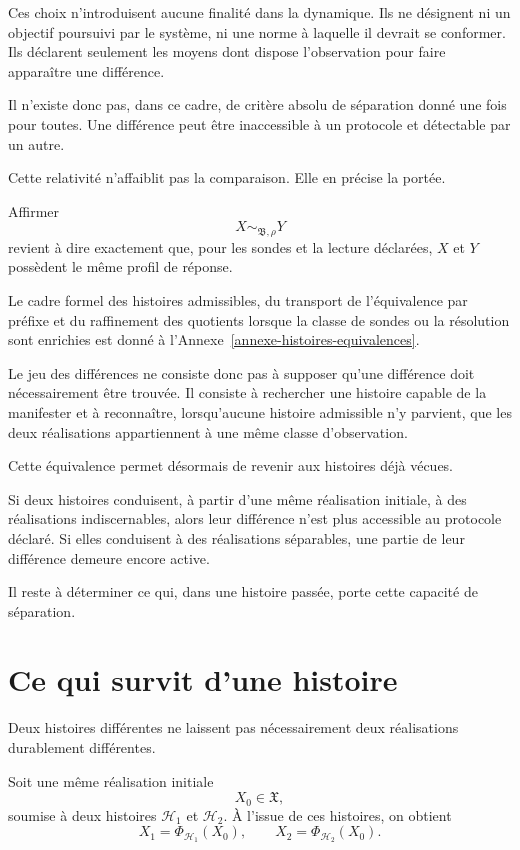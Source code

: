 Ces choix n'introduisent aucune finalité dans la dynamique. Ils ne désignent ni un objectif poursuivi par le système, ni une norme à laquelle il devrait se conformer. Ils déclarent seulement les moyens dont dispose l'observation pour faire apparaître une différence.

Il n'existe donc pas, dans ce cadre, de critère absolu de séparation donné une fois pour toutes. Une différence peut être inaccessible à un protocole et détectable par un autre.

Cette relativité n'affaiblit pas la comparaison. Elle en précise la portée.

Affirmer
\[
X\sim_{\mathfrak B,\rho}Y
\]
revient à dire exactement que, pour les sondes et la lecture déclarées, $X$ et $Y$ possèdent le même profil de réponse.

Le cadre formel des histoires admissibles, du transport de l'équivalence par préfixe et du raffinement des quotients lorsque la classe de sondes ou la résolution sont enrichies est donné à l'Annexe~\ref{annexe-histoires-equivalences}.

Le jeu des différences ne consiste donc pas à supposer qu'une différence doit nécessairement être trouvée. Il consiste à rechercher une histoire capable de la manifester et à reconnaître, lorsqu'aucune histoire admissible n'y parvient, que les deux réalisations appartiennent à une même classe d'observation.

Cette équivalence permet désormais de revenir aux histoires déjà vécues.

Si deux histoires conduisent, à partir d'une même réalisation initiale, à des réalisations indiscernables, alors leur différence n'est plus accessible au protocole déclaré. Si elles conduisent à des réalisations séparables, une partie de leur différence demeure encore active.

Il reste à déterminer ce qui, dans une histoire passée, porte cette capacité de séparation.

\section{Ce qui survit d'une histoire}
\label{t3-contenu-survivant}

Deux histoires différentes ne laissent pas nécessairement deux réalisations durablement différentes.

Soit une même réalisation initiale
\[
X_0\in\mathfrak X,
\]
soumise à deux histoires $\mathcal H_1$ et $\mathcal H_2$. À l'issue de ces histoires, on obtient
\[
X_1=\Phi_{\mathcal H_1}(X_0),
\qquad
X_2=\Phi_{\mathcal H_2}(X_0).
\]

